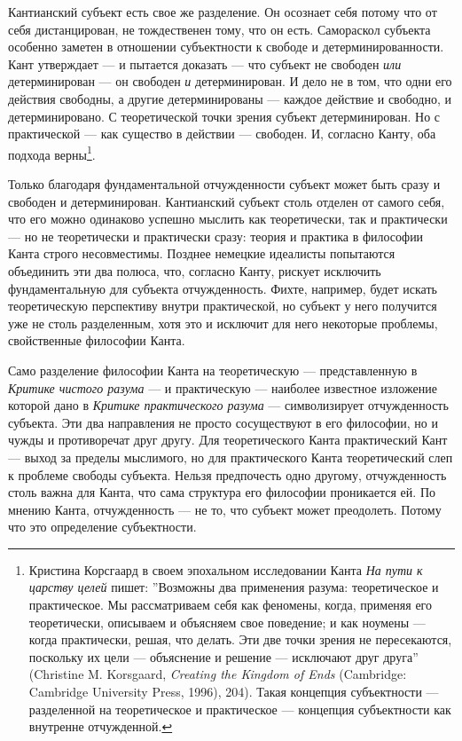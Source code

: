 \documentclass[12pt]{book}
\begin{document}
Кантианский субъект есть свое же разделение. Он осознает себя потому что от себя дистанцирован, не тождественен тому, что он есть. Самораскол субъекта особенно заметен в отношении субъектности к свободе и детерминированности. Кант утверждает --- и пытается доказать --- что субъект не свободен \textit{или} детерминирован --- он свободен \textit{и} детерминирован. И дело не в том, что одни его действия свободны, а другие детерминированы --- каждое действие и свободно, и детерминировано. С теоретической точки зрения субъект детерминирован. Но с практической --- как существо в действии --- свободен. И, согласно Канту, оба подхода верны\footnote{Кристина Корсгаард в своем эпохальном исследовании Канта \textit{На пути к царству целей} пишет: ''Возможны два применения разума: теоретическое и практическое. Мы рассматриваем себя как феномены, когда, применяя его теоретически, описываем и объясняем свое поведение; и как ноумены --- когда практически, решая, что делать. Эти две точки зрения не пересекаются, поскольку их цели --- объяснение и решение --- исключают друг друга'' (Christine M. Korsgaard, \textit{Creating the Kingdom of Ends} (Cambridge: Cambridge University Press, 1996), 204). Такая концепция субъектности --- разделенной на теоретическое и практическое --- концепция субъектности как внутренне отчужденной.}.

Только благодаря фундаментальной отчужденности субъект может быть сразу и свободен и детерминирован. Кантианский субъект столь отделен от самого себя, что его можно одинаково успешно мыслить как теоретически, так и практически --- но не теоретически и практически сразу: теория и практика в философии Канта строго несовместимы. Позднее немецкие идеалисты попытаются объединить эти два полюса, что, согласно Канту, рискует исключить фундаментальную для субъекта отчужденность. Фихте, например, будет искать теоретическую перспективу внутри практической, но субъект у него получится уже не столь разделенным, хотя это и исключит для него некоторые проблемы, свойственные философии Канта.

Само разделение философии Канта на теоретическую --- представленную в \textit{Критике чистого разума} --- и практическую --- наиболее известное изложение которой дано в \textit{Критике практического разума} --- символизирует отчужденность субъекта. Эти два направления не просто сосуществуют в его философии, но и чужды и противоречат друг другу. Для теоретического Канта практический Кант --- выход за пределы мыслимого, но для практического Канта теоретический слеп к проблеме свободы субъекта. Нельзя предпочесть одно другому, отчужденность столь важна для Канта, что сама структура его философии проникается ей. По мнению Канта, отчужденность --- не то, что субъект может преодолеть. Потому что это определение субъектности.
\end{document}
